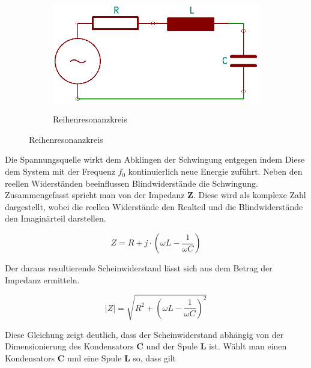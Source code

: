 {{\begin{figure}
    \begin{minipage}[r]{0.5\textwidth}
      \vspace{-16pt}
\begin{figure}[H]
  \centering
  \includegraphics[width=\textwidth]{Graphics/ResonanceCircuit_serial.png}
  \caption{Reihenresonanzkreis}{}
  \label{resonance_circuit_serial}
\end{figure}
      \vspace{-10pt}  
    \end{minipage}  
\end{figure}

\noindent Die Spannungsquelle wirkt dem Abklingen der Schwingung entgegen indem Diese dem System mit der Frequenz \(f_0\) kontinuierlich neue Energie zuführt. Neben den reellen Widerständen beeinflussen Blindwiderstände die Schwingung. Zusammengefasst spricht man von der Impedanz \textbf{Z}. Diese wird als komplexe Zahl dargestellt, wobei die reellen Widerstände den Realteil und die Blindwiderstände den Imaginärteil darstellen.

\begin{equation}
  Z = R + j \cdot (\omega L - \frac{1}{\omega C})
  \label{eq:Impedance}
\end{equation}

\noindent Der daraus resultierende Scheinwiderstand lässt sich aus dem Betrag der Impedanz ermitteln.

\begin{equation}
  |Z| = \sqrt{R^2 + (\omega L - \frac{1}{\omega C})^2}
  \label{eq:Impedance2}
\end{equation}

\noindent Diese Gleichung zeigt deutlich, dass der Scheinwiderstand abhängig von der Dimensionierung des Kondensators \textbf{C} und der Spule \textbf{L} ist. Wählt man einen Kondensators \textbf{C} und eine Spule \textbf{L} so, dass gilt

}}
